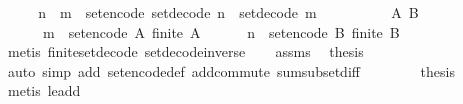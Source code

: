 \begin{isabellebody}
%
\isadelimproof
%
\endisadelimproof
%
\isatagproof
{}\isamarkupfalse%
\ {\isacharminus}\isanewline
\ \ \isamarkupfalse%
\ {\isachardoublequoteopen}n\ {\isacharequal}\ m\ {\isacharplus}\ set{\isacharunderscore}encode\ {\isacharparenleft}set{\isacharunderscore}decode\ n\ {\isacharminus}\ set{\isacharunderscore}decode\ m{\isacharparenright}{\isachardoublequoteclose}\isanewline
\ \ \isamarkupfalse%
\ {\isacharminus}\isanewline
\ \ \ \ \isamarkupfalse%
\ A\ B\ \isanewline
\ \ \ \ \ \ {\isachardoublequoteopen}m\ {\isacharequal}\ set{\isacharunderscore}encode\ A{\isachardoublequoteclose}\ {\isachardoublequoteopen}finite\ A{\isachardoublequoteclose}\isanewline
\ \ \ \ \ \ {\isachardoublequoteopen}n\ {\isacharequal}\ set{\isacharunderscore}encode\ B{\isachardoublequoteclose}\ {\isachardoublequoteopen}finite\ B{\isachardoublequoteclose}\isanewline
\ \ \ \ \ \ \isamarkupfalse%
\ {\isacharparenleft}metis\ finite{\isacharunderscore}set{\isacharunderscore}decode\ set{\isacharunderscore}decode{\isacharunderscore}inverse{\isacharparenright}\isanewline
\ \ \isamarkupfalse%
\ assms\ \isamarkupfalse%
\ {\isacharquery}thesis\isanewline
\ \ \ \ \isamarkupfalse%
\ auto\ {\isacharparenleft}simp\ add{\isacharcolon}\ set{\isacharunderscore}encode{\isacharunderscore}def\ add{\isachardot}commute\ sum{\isachardot}subset{\isacharunderscore}diff{\isacharparenright}\isanewline
\ \ \isamarkupfalse%
\isanewline
\ \ \isamarkupfalse%
\ \isamarkupfalse%
\ {\isacharquery}thesis\isanewline
\ \ \ \ \isamarkupfalse%
\ {\isacharparenleft}metis\ le{\isacharunderscore}add{}{\isacharparenright}\isanewline
{}\isamarkupfalse%
%
\endisatagproof
{\isafoldproof}%
%
\isadelimproof
\isanewline
%
\endisadelimproof
%
\isadelimtheory
\isanewline
%
\endisadelimtheory
%
\isatagtheory
{}\isamarkupfalse%
%
\endisatagtheory
{\isafoldtheory}%
%
\isadelimtheory
%
\endisadelimtheory
%
\end{isabellebody}%
\endinput
